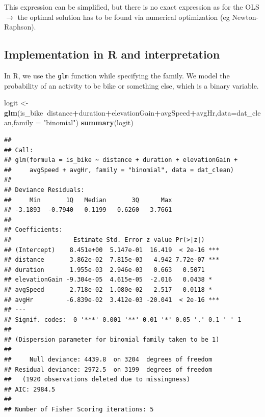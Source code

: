 \documentclass[
]{book}
\newenvironment{Shaded}{\begin{snugshade}}{\end{snugshade}}
\newcommand{\DataTypeTok}[1]{\textcolor[rgb]{0.13,0.29,0.53}{#1}}
\newcommand{\KeywordTok}[1]{\textcolor[rgb]{0.13,0.29,0.53}{\textbf{#1}}}
\newcommand{\NormalTok}[1]{#1}
\newcommand{\OperatorTok}[1]{\textcolor[rgb]{0.81,0.36,0.00}{\textbf{#1}}}
\newcommand{\StringTok}[1]{\textcolor[rgb]{0.31,0.60,0.02}{#1}}
\begin{document}
This expression can be simplified, but there is no exact expression as for the OLS \(\rightarrow\) the optimal solution has to be found via numerical optimization (eg Newton-Raphson).

\hypertarget{implementation-in-r-and-interpretation}{%
\subsection{Implementation in R and interpretation}\label{implementation-in-r-and-interpretation}}

In R, we use the \texttt{glm} function while specifying the family. We model the probability of an activity to be bike or something else, which is a binary variable.

\begin{Shaded}
\begin{Highlighting}[]
\NormalTok{logit <-}\StringTok{ }\KeywordTok{glm}\NormalTok{(is_bike}\OperatorTok{~}\NormalTok{distance}\OperatorTok{+}\NormalTok{duration}\OperatorTok{+}\NormalTok{elevationGain}\OperatorTok{+}\NormalTok{avgSpeed}\OperatorTok{+}\NormalTok{avgHr,}\DataTypeTok{data=}\NormalTok{dat_clean,}\DataTypeTok{family =} \StringTok{"binomial"}\NormalTok{)}
\KeywordTok{summary}\NormalTok{(logit)}
\end{Highlighting}
\end{Shaded}

\begin{verbatim}
## 
## Call:
## glm(formula = is_bike ~ distance + duration + elevationGain + 
##     avgSpeed + avgHr, family = "binomial", data = dat_clean)
## 
## Deviance Residuals: 
##     Min       1Q   Median       3Q      Max  
## -3.1893  -0.7940   0.1199   0.6260   3.7661  
## 
## Coefficients:
##                 Estimate Std. Error z value Pr(>|z|)    
## (Intercept)    8.451e+00  5.147e-01  16.419  < 2e-16 ***
## distance       3.862e-02  7.815e-03   4.942 7.72e-07 ***
## duration       1.955e-03  2.946e-03   0.663   0.5071    
## elevationGain -9.304e-05  4.615e-05  -2.016   0.0438 *  
## avgSpeed       2.718e-02  1.080e-02   2.517   0.0118 *  
## avgHr         -6.839e-02  3.412e-03 -20.041  < 2e-16 ***
## ---
## Signif. codes:  0 '***' 0.001 '**' 0.01 '*' 0.05 '.' 0.1 ' ' 1
## 
## (Dispersion parameter for binomial family taken to be 1)
## 
##     Null deviance: 4439.8  on 3204  degrees of freedom
## Residual deviance: 2972.5  on 3199  degrees of freedom
##   (1920 observations deleted due to missingness)
## AIC: 2984.5
## 
## Number of Fisher Scoring iterations: 5
\end{verbatim}
\end{document}
